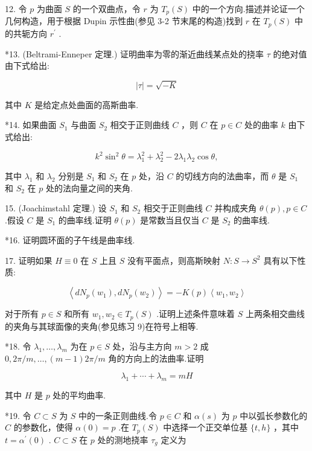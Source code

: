12. 令 \(p\) 为曲面 \(S\) 的一个双曲点，令 \(r\) 为 \({T}_{p}\left( S\right)\) 中的一个方向.描述并论证一个几何构造，用于根据 Dupin 示性曲(参见 3-2 节末尾的构造)找到 \(r\) 在 \({T}_{p}\left( S\right)\) 中的共轭方向 \({r}^{\prime }\) .

*13. (Beltrami-Enneper 定理.) 证明曲率为零的渐近曲线某点处的挠率 \(\tau\) 的绝对值由下式给出:

\[
\left| \tau \right|  = \sqrt{-K}
\]

其中 \(K\) 是给定点处曲面的高斯曲率.

*14. 如果曲面 \({S}_{1}\) 与曲面 \({S}_{2}\) 相交于正则曲线 \(C\) ，则 \(C\) 在 \(p \in  C\) 处的曲率 \(k\) 由下式给出:

\[
{k}^{2}{\sin }^{2}\theta  = {\lambda }_{1}^{2} + {\lambda }_{2}^{2} - 2{\lambda }_{1}{\lambda }_{2}\cos \theta ,
\]

其中 \({\lambda }_{1}\) 和 \({\lambda }_{2}\) 分别是 \({S}_{1}\) 和 \({S}_{2}\) 在 \(p\) 处，沿 \(C\) 的切线方向的法曲率，而 \(\theta\) 是 \({S}_{1}\) 和 \({S}_{2}\) 在 \(p\) 处的法向量之间的夹角.

15. (Joachimstahl 定理.) 设 \({S}_{1}\) 和 \({S}_{2}\) 相交于正则曲线 \(C\) 并构成夹角 \(\theta \left( p\right) ,p \in  C\) .假设 \(C\) 是 \({S}_{1}\) 的曲率线.证明 \(\theta \left( p\right)\) 是常数当且仅当 \(C\) 是 \({S}_{2}\) 的曲率线.

*16. 证明圆环面的子午线是曲率线.

17. 证明如果 \(H \equiv  0\) 在 \(S\) 上且 \(S\) 没有平面点，则高斯映射 \(N : S \rightarrow  {S}^{2}\) 具有以下性质:

\[
\left\langle  {d{N}_{p}\left( {w}_{1}\right) ,d{N}_{p}\left( {w}_{2}\right) }\right\rangle   =  - K\left( p\right) \left\langle  {{w}_{1},{w}_{2}}\right\rangle
\]

对于所有 \(p \in  S\) 和所有 \({w}_{1},{w}_{2} \in  {T}_{p}\left( S\right)\) .证明上述条件意味着 \(S\) 上两条相交曲线的夹角与其球面像的夹角(参见练习 9)在符号上相等.

*18. 令 \({\lambda }_{1},\ldots ,{\lambda }_{m}\) 为在 \(p \in  S\) 处，沿与主方向 \(m > 2\) 成 \(0,{2\pi }/m,\ldots ,\left( {m - 1}\right) {2\pi }/m\) 角的方向上的法曲率.证明

\[
{\lambda }_{1} + \cdots  + {\lambda }_{m} = {mH}
\]

其中 \(H\) 是 \(p\) 处的平均曲率.

*19. 令 \(C \subset  S\) 为 \(S\) 中的一条正则曲线.令 \(p \in  C\) 和 \(\alpha \left( s\right)\) 为 \(p\) 中以弧长参数化的 \(C\) 的参数化，使得 \(\alpha \left( 0\right)  = p\) .在 \({T}_{p}\left( S\right)\) 中选择一个正交单位基 \(\{ t,h\}\) ，其中 \(t = {\alpha }^{\prime }\left( 0\right)\) . \(C \subset  S\) 在 \(p\) 处的测地挠率 \({\tau }_{g}\) 定义为

